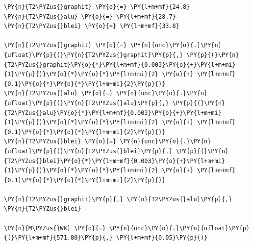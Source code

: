     \begin{tcolorbox}[breakable, size=fbox, boxrule=1pt, pad at break*=1mm,colback=cellbackground, colframe=cellborder]
\begin{Verbatim}[commandchars=\\\{\}]
\PY{n}{T2\PYZus{}graphit} \PY{o}{=} \PY{l+m+mf}{24.8}
\PY{n}{T2\PYZus{}alu} \PY{o}{=} \PY{l+m+mf}{28.7}
\PY{n}{T2\PYZus{}blei} \PY{o}{=} \PY{l+m+mf}{33.8}

\PY{n}{T2\PYZus{}graphit} \PY{o}{=} \PY{n}{unc}\PY{o}{.}\PY{n}{ufloat}\PY{p}{(}\PY{n}{T2\PYZus{}graphit}\PY{p}{,} \PY{p}{(}\PY{n}{T2\PYZus{}graphit}\PY{o}{*}\PY{l+m+mf}{0.003}\PY{o}{+}\PY{l+m+mi}{1}\PY{p}{)}\PY{o}{*}\PY{o}{*}\PY{l+m+mi}{2} \PY{o}{+} \PY{l+m+mf}{0.1}\PY{o}{*}\PY{o}{*}\PY{l+m+mi}{2}\PY{p}{)}
\PY{n}{T2\PYZus{}alu} \PY{o}{=} \PY{n}{unc}\PY{o}{.}\PY{n}{ufloat}\PY{p}{(}\PY{n}{T2\PYZus{}alu}\PY{p}{,} \PY{p}{(}\PY{n}{T2\PYZus{}alu}\PY{o}{*}\PY{l+m+mf}{0.003}\PY{o}{+}\PY{l+m+mi}{1}\PY{p}{)}\PY{o}{*}\PY{o}{*}\PY{l+m+mi}{2} \PY{o}{+} \PY{l+m+mf}{0.1}\PY{o}{*}\PY{o}{*}\PY{l+m+mi}{2}\PY{p}{)}
\PY{n}{T2\PYZus{}blei} \PY{o}{=} \PY{n}{unc}\PY{o}{.}\PY{n}{ufloat}\PY{p}{(}\PY{n}{T2\PYZus{}blei}\PY{p}{,} \PY{p}{(}\PY{n}{T2\PYZus{}blei}\PY{o}{*}\PY{l+m+mf}{0.003}\PY{o}{+}\PY{l+m+mi}{1}\PY{p}{)}\PY{o}{*}\PY{o}{*}\PY{l+m+mi}{2} \PY{o}{+} \PY{l+m+mf}{0.1}\PY{o}{*}\PY{o}{*}\PY{l+m+mi}{2}\PY{p}{)}

\PY{n}{T2\PYZus{}graphit}\PY{p}{,} \PY{n}{T2\PYZus{}alu}\PY{p}{,} \PY{n}{T2\PYZus{}blei}

\PY{n}{M\PYZus{}WK} \PY{o}{=} \PY{n}{unc}\PY{o}{.}\PY{n}{ufloat}\PY{p}{(}\PY{l+m+mf}{571.80}\PY{p}{,} \PY{l+m+mf}{0.05}\PY{p}{)}
\end{Verbatim}
\end{tcolorbox}

